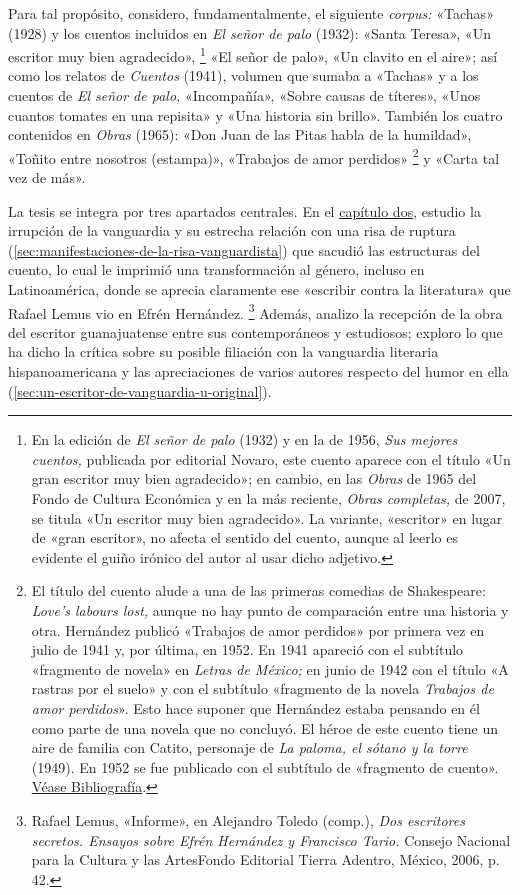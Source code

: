 \documentclass[14pt,twoside,final]{extbook} %
\let\oldfootnote\footnote
\renewcommand\footnote[1]{%
\oldfootnote{\hspace{1mm}#1}}
\begin{document}
Para tal propósito, considero, fundamentalmente, el siguiente \emph{corpus:} «Tachas» (1928) y los cuentos incluidos en \emph{El señor de palo} (1932): «Santa Teresa», «Un escritor muy bien agradecido»,\footnote{En la edición de \emph{El señor de palo} (1932) y en la de 1956, \emph{Sus mejores cuentos,} publicada por editorial Novaro, este cuento aparece con el título «Un gran escritor muy bien agradecido»; en cambio, en las \emph{Obras} de 1965 del Fondo de Cultura Económica y en la más reciente, \emph{Obras completas,} de 2007, se titula «Un escritor muy bien agradecido». La variante, «escritor» en lugar de «gran escritor», no afecta el sentido del cuento, aunque al leerlo es evidente el guiño irónico del autor al usar dicho adjetivo.} «El señor de palo», «Un clavito en el aire»; así como los relatos de \emph{Cuentos} (1941), volumen que sumaba a «Tachas» y a los cuentos de \emph{El señor de palo,} «Incompañía», «Sobre causas de títeres», «Unos cuantos tomates en una repisita» y «Una historia sin brillo». También los cuatro contenidos en \emph{Obras} (1965): «Don Juan de las Pitas habla de la humildad», «Toñito entre nosotros (estampa)», «Trabajos de amor perdidos»\footnote{El título del cuento alude a una de las primeras comedias de Shakespeare: \emph{Love's labours lost,} aunque no hay punto de comparación entre una historia y otra. Hernández publicó «Trabajos de amor perdidos» por primera vez en julio de 1941 y, por última, en 1952. En 1941 apareció con el subtítulo «fragmento de novela» en \emph{Letras de México;} en junio de 1942 con el título «A rastras por el suelo» y con el subtítulo «fragmento de la novela \emph{Trabajos de amor perdidos}». Esto hace suponer que Hernández estaba pensando en él como parte de una novela que no concluyó. El héroe de este cuento tiene un aire de familia con Catito, personaje de \emph{La paloma, el sótano y la torre} (1949). En 1952 se fue publicado con el subtítulo de «fragmento de cuento». \hyperref[bib:hernandez1952]{Véase Bibliografía}.} y «Carta tal vez de más».

La tesis se integra por tres apartados centrales. En el \hyperref[ch:risa-vanguardia-y-cuento-hispanoamericano]{capítulo dos}, estudio la irrupción de la vanguardia y su estrecha relación con una risa de ruptura (\autoref{sec:manifestaciones-de-la-risa-vanguardista}) que sacudió las estructuras del cuento, lo cual le imprimió una transformación al género, incluso en Latinoamérica, donde se aprecia claramente ese «escribir contra la literatura» que Rafael Lemus vio en Efrén Hernández.\footnote{Rafael Lemus, «Informe», en Alejandro Toledo (comp.), \emph{Dos escritores secretos. Ensayos sobre Efrén Hernández y Francisco Tario.} Consejo Nacional para la Cultura y las Artes\kernedslash Fondo Editorial Tierra Adentro, México, 2006, p. 42.} Además, analizo la recepción de la obra del escritor guanajuatense entre sus contemporáneos y estudiosos; exploro lo que ha dicho la crítica sobre su posible filiación con la vanguardia literaria hispanoamericana y las apreciaciones de varios autores respecto del humor en ella (\autoref{sec:un-escritor-de-vanguardia-u-original}).
\end{document}
